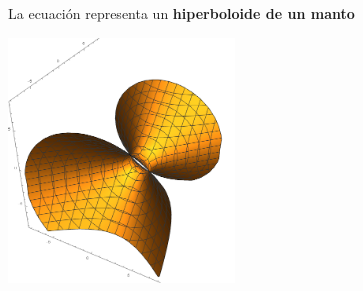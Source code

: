 \documentclass{article}
\begin{document}
\begin{enumerate}
{\begin{enumerate}
{\begin{center}
                        \end{center}
                        La ecuación representa un {\bf hiperboloide de un manto}
                        \begin{center}
                            \includegraphics[width=6cm]{img/7b.png}
                        \end{center}
                    }
                \end{enumerate}
            }
        \end{enumerate}
    
\end{document}
